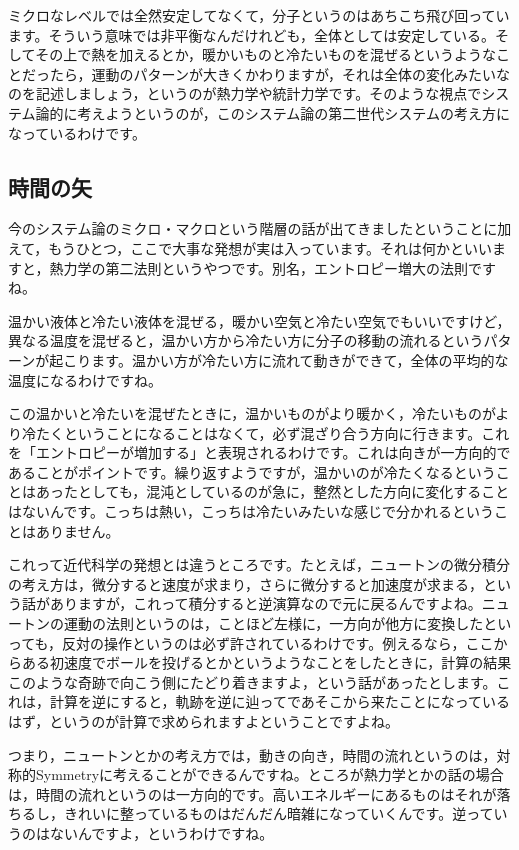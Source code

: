 \documentclass{ltjsbook}
\begin{document}
ミクロなレベルでは全然安定してなくて，分子というのはあちこち飛び回っています。そういう意味では非平衡なんだけれども，全体としては安定している。そしてその上で熱を加えるとか，暖かいものと冷たいものを混ぜるというようなことだったら，運動のパターンが大きくかわりますが，それは全体の変化みたいなのを記述しましょう，というのが熱力学や統計力学です。そのような視点でシステム論的に考えようというのが，このシステム論の第二世代システムの考え方になっているわけです。

\subsection{時間の矢}

今のシステム論のミクロ・マクロという階層の話が出てきましたということに加えて，もうひとつ，ここで大事な発想が実は入っています。それは何かといいますと，熱力学の第二法則というやつです。別名，エントロピー増大の法則ですね。

温かい液体と冷たい液体を混ぜる，暖かい空気と冷たい空気でもいいですけど，異なる温度を混ぜると，温かい方から冷たい方に分子の移動の流れるというパターンが起こります。温かい方が冷たい方に流れて動きができて，全体の平均的な温度になるわけですね。

この温かいと冷たいを混ぜたときに，温かいものがより暖かく，冷たいものがより冷たくということになることはなくて，必ず混ざり合う方向に行きます。これを「エントロピーが増加する」と表現されるわけです。これは向きが一方向的であることがポイントです。繰り返すようですが，温かいのが冷たくなるということはあったとしても，混沌としているのが急に，整然とした方向に変化することはないんです。こっちは熱い，こっちは冷たいみたいな感じで分かれるということはありません。

これって近代科学の発想とは違うところです。たとえば，ニュートンの微分積分の考え方は，微分すると速度が求まり，さらに微分すると加速度が求まる，という話がありますが，これって積分すると逆演算なので元に戻るんですよね。ニュートンの運動の法則というのは，ことほど左様に，一方向が他方に変換したといっても，反対の操作というのは必ず許されているわけです。例えるなら，ここからある初速度でボールを投げるとかというようなことをしたときに，計算の結果このような奇跡で向こう側にたどり着きますよ，という話があったとします。これは，計算を逆にすると，軌跡を逆に辿ってであそこから来たことになっているはず，というのが計算で求められますよということですよね。

つまり，ニュートンとかの考え方では，動きの向き，時間の流れというのは，対称的Symmetryに考えることができるんですね。ところが熱力学とかの話の場合は，時間の流れというのは一方向的です。高いエネルギーにあるものはそれが落ちるし，きれいに整っているものはだんだん暗雑になっていくんです。逆っていうのはないんですよ，というわけですね。
\end{document}
